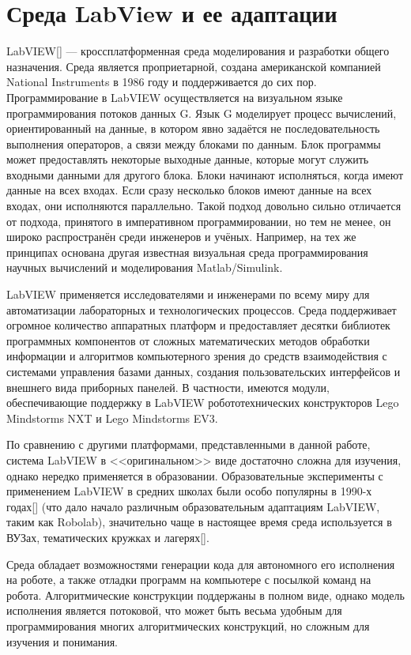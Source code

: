 \documentclass[a5paper]{article}
\begin{document}
\section{Среда LabView и ее адаптации}

LabVIEW[] --- кроссплатформенная среда моделирования и разработки общего назначения. Среда является проприетарной, 
создана американской компанией National Instruments в 1986 году и поддерживается до сих пор. Программирование 
в LabVIEW осуществляется на визуальном языке программирования потоков данных G. Язык G моделирует процесс 
вычислений, ориентированный на данные, в котором явно задаётся не последовательность выполнения операторов, 
а связи между блоками по данным. Блок программы может предоставлять некоторые выходные данные, которые могут 
служить входными данными для другого блока. Блоки начинают исполняться, когда имеют данные на всех входах. 
Если сразу несколько блоков имеют данные на всех входах, они исполняются параллельно. Такой подход довольно 
сильно отличается от подхода, принятого в императивном программировании, но тем не менее, он широко 
распространён среди инженеров и учёных. Например, на тех же принципах основана другая известная визуальная 
среда программирования научных вычислений и моделирования Matlab/Simulink.

LabVIEW применяется исследователями и инженерами по всему миру для автоматизации лабораторных и технологических 
процессов. Среда поддерживает огромное количество аппаратных платформ и предоставляет десятки библиотек 
программных компонентов от сложных математических методов обработки информации и алгоритмов компьютерного 
зрения до средств взаимодействия с системами управления базами данных, создания пользовательских интерфейсов 
и внешнего вида приборных панелей. В частности, имеются модули, обеспечивающие поддержку в LabVIEW 
робототехнических конструкторов Lego Mindstorms NXT и Lego Mindstorms EV3.

По сравнению с другими платформами, представленными в данной работе, система LabVIEW в <<оригинальном>> виде 
достаточно сложна для изучения, однако нередко применяется в образовании. Образовательные эксперименты с 
применением LabVIEW в средних школах были особо популярны в 1990-х годах[] (что дало начало различным 
образовательным адаптациям LabVIEW, таким как Robolab), значительно чаще в настоящее время среда используется 
в ВУЗах, тематических кружках и лагерях[].

Среда обладает возможностями генерации кода для автономного его исполнения на роботе, а также отладки программ 
на компьютере с посылкой команд на робота. Алгоритмические конструкции поддержаны в полном виде, однако модель 
исполнения является потоковой, что может быть весьма удобным для программирования многих алгоритмических 
конструкций, но сложным для изучения и понимания.
\end{document}
